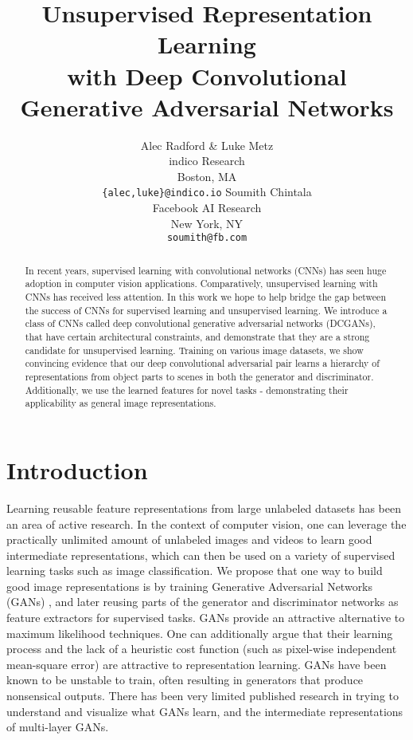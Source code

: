 \documentclass{article} \usepackage{iclr2016_conference,times}
\title{Unsupervised Representation Learning\\ with Deep Convolutional\\ Generative Adversarial Networks}
\author{Alec Radford \& Luke Metz\\
indico Research\\
Boston, MA\\
\texttt{\{alec,luke\}@indico.io}
\AND
Soumith Chintala\\
Facebook AI Research\\
New York, NY\\
\texttt{soumith@fb.com}
}
\begin{document}
\maketitle

\begin{abstract}
In recent years, supervised learning with convolutional networks (CNNs) has seen huge adoption in computer vision applications. Comparatively, unsupervised learning with CNNs has received less attention. In this work we hope to help bridge the gap between the success of CNNs for supervised learning and unsupervised learning. We introduce a class of CNNs called deep convolutional generative adversarial networks (DCGANs), that have certain architectural constraints,  and demonstrate that they are a strong candidate for unsupervised learning. Training on various image datasets, we show convincing evidence that our deep convolutional adversarial pair learns a hierarchy of representations from object parts to scenes in both the generator and discriminator. Additionally, we use the learned features for novel tasks - demonstrating their applicability as general image representations.
\end{abstract}

\section{Introduction}

Learning reusable feature representations from large unlabeled datasets has been an area of active research. In the context of computer vision, one can leverage the practically unlimited amount of unlabeled images and videos to learn good intermediate representations, which can then be used on a variety of supervised learning tasks such as image classification. We propose that one way to build good image representations is by training Generative Adversarial Networks (GANs) \citep{Goodfellow2014}, and later reusing parts of the generator and discriminator networks as feature extractors for supervised tasks. GANs provide an attractive alternative to maximum likelihood techniques. One can additionally argue that their learning process and the lack of a heuristic cost function (such as pixel-wise independent mean-square error) are attractive to representation learning. GANs have been known to be unstable to train, often resulting in generators that produce nonsensical outputs. There has been very limited published research in trying to understand and visualize what GANs learn, and the intermediate representations of multi-layer GANs.
\end{document}
